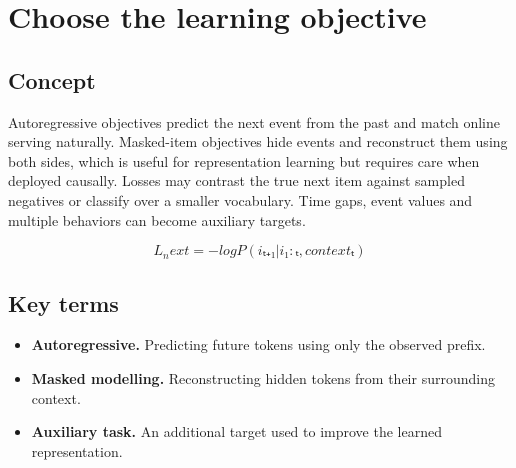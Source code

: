 \section{Choose the learning objective}

\begin{abstract}
The target determines what information the sequence representation learns to preserve.
\end{abstract}

\subsection{Concept}
Autoregressive objectives predict the next event from the past and match online serving naturally. Masked-item objectives hide events and reconstruct them using both sides, which is useful for representation learning but requires care when deployed causally. Losses may contrast the true next item against sampled negatives or classify over a smaller vocabulary. Time gaps, event values and multiple behaviors can become auxiliary targets.

\begin{equation*}
L_next = -log P(iₜ₊₁ | i₁:ₜ, contextₜ)
\end{equation*}

\subsection{Key terms}
\begin{itemize}
\item \textbf{Autoregressive.} Predicting future tokens using only the observed prefix.
\item \textbf{Masked modelling.} Reconstructing hidden tokens from their surrounding context.
\item \textbf{Auxiliary task.} An additional target used to improve the learned representation.
\end{itemize}
